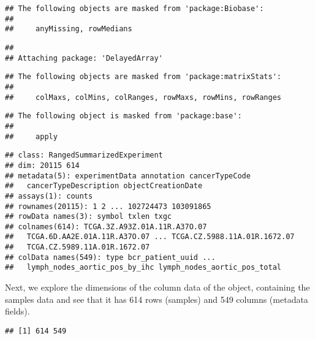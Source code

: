 \documentclass[]{article}
\begin{document}
\begin{verbatim}
## The following objects are masked from 'package:Biobase':
## 
##     anyMissing, rowMedians
\end{verbatim}

\begin{verbatim}
## 
## Attaching package: 'DelayedArray'
\end{verbatim}

\begin{verbatim}
## The following objects are masked from 'package:matrixStats':
## 
##     colMaxs, colMins, colRanges, rowMaxs, rowMins, rowRanges
\end{verbatim}

\begin{verbatim}
## The following object is masked from 'package:base':
## 
##     apply
\end{verbatim}

\begin{verbatim}
## class: RangedSummarizedExperiment 
## dim: 20115 614 
## metadata(5): experimentData annotation cancerTypeCode
##   cancerTypeDescription objectCreationDate
## assays(1): counts
## rownames(20115): 1 2 ... 102724473 103091865
## rowData names(3): symbol txlen txgc
## colnames(614): TCGA.3Z.A93Z.01A.11R.A37O.07
##   TCGA.6D.AA2E.01A.11R.A37O.07 ... TCGA.CZ.5988.11A.01R.1672.07
##   TCGA.CZ.5989.11A.01R.1672.07
## colData names(549): type bcr_patient_uuid ...
##   lymph_nodes_aortic_pos_by_ihc lymph_nodes_aortic_pos_total
\end{verbatim}

Next, we explore the dimensions of the column data of the object,
containing the samples data and see that it has 614 rows (samples) and
549 columns (metadata fields).

\begin{verbatim}
## [1] 614 549
\end{verbatim}
\end{document}
